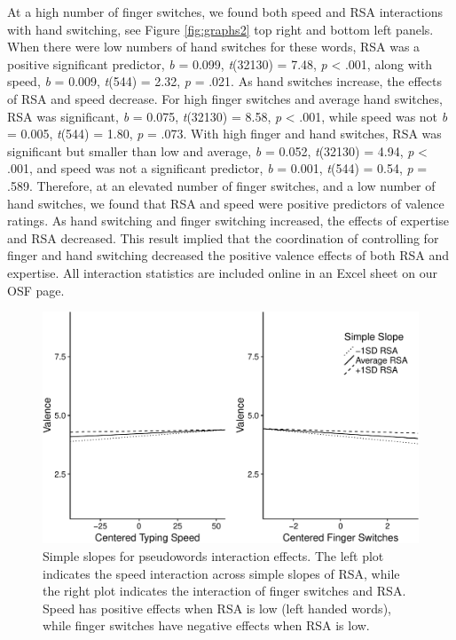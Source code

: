 \documentclass[english,man]{apa6}
\theoremstyle{definition}
\theoremstyle{definition}
\theoremstyle{definition}
\theoremstyle{remark}
\begin{document}
At a high number of finger switches, we found both speed and RSA
interactions with hand switching, see Figure \ref{fig:graphs2} top right
and bottom left panels. When there were low numbers of hand switches for
these words, RSA was a positive significant predictor, \emph{b} = 0.099,
\emph{t}(32130) = 7.48, \emph{p} \textless{} .001, along with speed,
\emph{b} = 0.009, \emph{t}(544) = 2.32, \emph{p} = .021. As hand
switches increase, the effects of RSA and speed decrease. For high
finger switches and average hand switches, RSA was significant, \emph{b}
= 0.075, \emph{t}(32130) = 8.58, \emph{p} \textless{} .001, while speed
was not \emph{b} = 0.005, \emph{t}(544) = 1.80, \emph{p} = .073. With
high finger and hand switches, RSA was significant but smaller than low
and average, \emph{b} = 0.052, \emph{t}(32130) = 4.94, \emph{p}
\textless{} .001, and speed was not a significant predictor, \emph{b} =
0.001, \emph{t}(544) = 0.54, \emph{p} = .589. Therefore, at an elevated
number of finger switches, and a low number of hand switches, we found
that RSA and speed were positive predictors of valence ratings. As hand
switching and finger switching increased, the effects of expertise and
RSA decreased. This result implied that the coordination of controlling
for finger and hand switching decreased the positive valence effects of
both RSA and expertise. All interaction statistics are included online
in an Excel sheet on our OSF page.

\begin{figure}
\centering
\includegraphics{QWERTY_files/figure-latex/graphs-1.pdf}
\caption{\label{fig:graphs}Simple slopes for pseudowords interaction
effects. The left plot indicates the speed interaction across simple
slopes of RSA, while the right plot indicates the interaction of finger
switches and RSA. Speed has positive effects when RSA is low (left
handed words), while finger switches have negative effects when RSA is
low.}
\end{figure}
\end{document}
